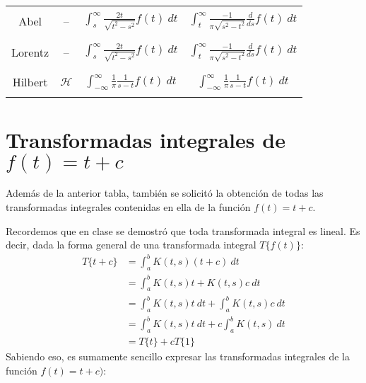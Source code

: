 \documentclass[12pt, a4paper]{article}
\begin{document}
\begin{center}
\begin{tabular}{c c c c}
        \midrule
        \\ Abel & – & \(\int_s^{\infty} \frac{2t}{\sqrt{t^2 - s^2}}f(t)\ dt\) & \(\int_t^{\infty} \frac{-1}{\pi\sqrt{s^2 - t^2}}\frac{d}{ds} f(t)\ dt\)\\ \\
        \midrule
        \\ Lorentz & – & \(\int_s^{\infty} \frac{2t}{\sqrt{t^2 - s^2}}f(t)\ dt\) & \(\int_t^{\infty} \frac{-1}{\pi\sqrt{s^2 - t^2}}\frac{d}{ds} f(t)\ dt\)\\ \\
        \midrule
        \\ Hilbert & \(\mathcal{H}\) & \(\int_{-\infty}^{\infty} \frac{1}{\pi}\frac{1}{s-t} f(t)\ dt\) & \(\int_{-\infty}^{\infty} \frac{1}{\pi} \frac{1}{s-t} f(t)\ dt\) \\ \\
        \bottomrule
    \end{tabular}
\end{center}

\section{Transformadas integrales de \texorpdfstring{\(f(t) = t+c\)}{f (t) = t + c}}

Además de la anterior tabla, también se solicitó la obtención de todas las transformadas integrales contenidas en ella de la función \(f(t) = t + c\).

Recordemos que en clase se demostró que toda transformada integral es lineal. Es decir, dada la forma general de una transformada integral \(T\{f(t)\}\):
\begin{align*}
    T\{t+c\} &= \int_{a}^{b} K(t,s) (t+c) \ dt \\
    &= \int_{a}^{b} K(t,s) t + K(t,s) c \ dt \\
    &= \int_{a}^{b} K(t,s) t \ dt + \int_{a}^{b} K(t,s) c \ dt \\
    &= \int_{a}^{b} K(t,s) t \ dt + c \int_{a}^{b} K(t,s) \ dt \\
    &= T\{t\} + c T\{1\}
\end{align*}
Sabiendo eso, es sumamente sencillo expresar las transformadas integrales de la función \(f(t) = t+c)\):
\end{document}
